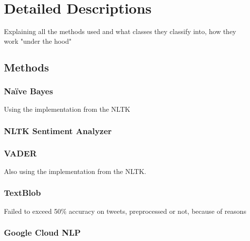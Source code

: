 \chapter{Detailed Descriptions}
\label{chapter:DetailedDescriptions}\label{sentimentanalysis}


Explaining all the methods used and what classes they classify into, how they work "under the hood"

\section{Methods}
\label{sec:methods}

\subsection{Na\"{i}ve Bayes}
\label{subsec:naivebayes}

Using the implementation from the NLTK

\subsection{NLTK Sentiment Analyzer}
\label{subsec:nltksentimentanalyzer}

\subsection{VADER}
\label{subsec:vader}

Also using the implementation from the NLTK.
\cite{Hutto2014}

\subsection{TextBlob}
\label{subsec:textblob}

Failed to exceed 50\% accuracy on tweets, preprocessed or not, because of reasons

\subsection{Google Cloud NLP}
\label{subsec:googleCloudNlp} %

